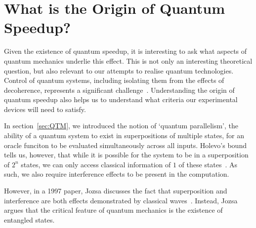 \documentclass{standalone}
\begin{document}
\section{What is the Origin of Quantum Speedup?}
Given the existence of quantum speedup, it is interesting to ask what aspects of quantum mechanics underlie this effect. This is not only an interesting theoretical question, but also relevant to our attempts to realise quantum technologies. Control of quantum systems, including isolating them from the effects of decoherence, represents a significant challenge~\cite{Shor1997}. Understanding the origin of quantum speedup also helps us to understand what criteria our experimental devices will need to satisfy.
\par
In section~\ref{sec:QTM}, we introduced the notion of `quantum parallelism', the ability of a quantum system to exist in superpositions of multiple states, for an oracle funciton to be evaluated simultaneously across all inputs. Holevo's bound tells us, however, that while it is possible for the system to be in a superposition of $2^{n}$ states, we can only access classical information of $1$ of these states~\cite{holevo1973}. As such, we also require interference effects to be present in the computation.
\par
However, in a 1997 paper, Jozsa discusses the fact that superposition and interference are both effects demonstrated by classical waves~\cite{Jozsa1997}. Instead, Jozsa argues that the critical feature of quantum mechanics is the existence of entangled states. 
\par
\end{document}
